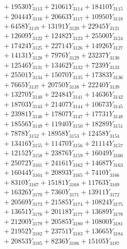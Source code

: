\documentclass[a4paper,10pt]{article}
\begin{document}
{\begin{align}
&\;  + 19530 Y_{3113} + 21061 Y_{3114} + 18410 Y_{3115} \\[0.3ex]
&\;  + 20444 Y_{3116} + 20663 Y_{3117} + 10950 Y_{3118} \\[0.5ex]\allowbreak
&\;  + 6458 Y_{3119} + 13191 Y_{3120} + 22945 Y_{3121} \\[0.3ex]
&\;  + 12609 Y_{3122} + 12482 Y_{3123} + 25500 Y_{3124} \\[0.3ex]
&\;  + 17424 Y_{3125} + 22714 Y_{3126} + 14926 Y_{3127} \\[0.3ex]
&\;  + 14131 Y_{3128} + 7976 Y_{3129} + 23237 Y_{3130} \\[0.3ex]
&\;  + 12546 Y_{3131} + 13462 Y_{3132} + 7239 Y_{3133} \\[0.3ex]
&\;  + 25501 Y_{3134} + 15070 Y_{3135} + 17383 Y_{3136} \\[0.3ex]
&\;  + 7665 Y_{3137} + 20750 Y_{3138} + 22240 Y_{3139} \\[0.3ex]
&\;  + 13270 Y_{3140} + 22484 Y_{3141} + 14636 Y_{3142} \\[0.3ex]
&\;  + 18703 Y_{3143} + 21407 Y_{3144} + 10673 Y_{3145} \\[0.3ex]
&\;  + 23981 Y_{3146} + 17807 Y_{3147} + 17731 Y_{3148} \\[0.5ex]\allowbreak
&\;  + 18556 Y_{3149} + 11940 Y_{3150} + 18289 Y_{3151} \\[0.3ex]
&\;  + 7878 Y_{3152} + 18958 Y_{3153} + 12458 Y_{3154} \\[0.3ex]
&\;  + 13416 Y_{3155} + 11470 Y_{3156} + 21114 Y_{3157} \\[0.3ex]
&\;  + 12152 Y_{3158} + 23876 Y_{3159} + 16049 Y_{3160} \\[0.3ex]
&\;  + 25072 Y_{3161} + 24161 Y_{3162} + 14687 Y_{3163} \\[0.3ex]
&\;  + 16044 Y_{3164} + 20893 Y_{3165} + 7410 Y_{3166} \\[0.3ex]
&\;  + 8310 Y_{3167} + 15181 Y_{3168} + 11763 Y_{3169} \\[0.3ex]
&\;  + 16326 Y_{3170} + 7360 Y_{3171} + 13911 Y_{3172} \\[0.3ex]
&\;  + 20569 Y_{3173} + 21585 Y_{3174} + 10824 Y_{3175} \\[0.3ex]
&\;  + 13651 Y_{3176} + 20118 Y_{3177} + 13689 Y_{3178} \\[0.5ex]\allowbreak
&\;  + 21200 Y_{3179} + 20585 Y_{3180} + 10800 Y_{3181} \\[0.3ex]
&\;  + 21952 Y_{3182} + 23751 Y_{3183} + 13665 Y_{3184} \\[0.3ex]
&\;  + 20853 Y_{3185} + 8236 Y_{3186} + 15105 Y_{3187} \\[0.3ex]

\end{align}}
\end{document}
